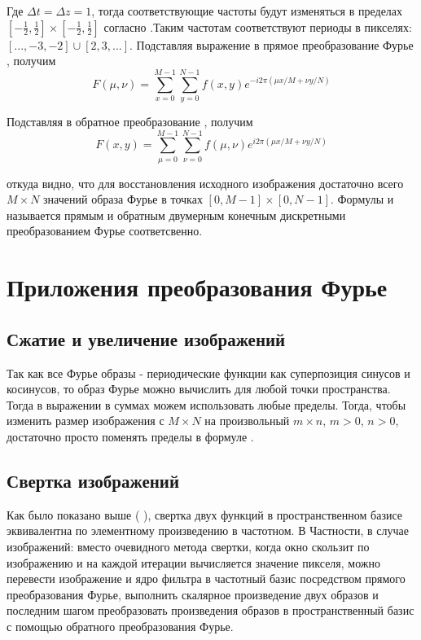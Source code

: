 \documentclass[oneside,final,14pt]{extreport}
\begin{document}
Где $\varDelta t = \varDelta z = 1$, тогда соответствующие частоты будут изменяться в 
 пределах $[-\frac{1}{2},
\frac{1}{2}]
\times
[-\frac{1}{2},
\frac{1}{2}]$ согласно .Таким частотам соответствуют периоды в пикселях: $[...,-3,-2] \cup [2,3,...]$.
Подставляя выражение  в прямое преобразование Фурье , получим
\begin{equation}
F(\mu,\nu)
=
\sum_
{ x =  0}^{M-1}
\sum_
{ y =  0}^{N-1}
f(x,y)
e^{
-i2\pi(\mu x / M +
 \nu y / N )
}
\label{DFFT_2d}
\end{equation}

Подставляя  в обратное преобразование , получим
\begin{equation}
F(x,y)
=
\sum_
{ \mu =  0}^{M-1}
\sum_
{ \nu =  0}^{N-1}
f(\mu,\nu)
e^{
 i2\pi(\mu x / M +
 \nu y / N )
 \label{DIFFT_2d}
}
\end{equation}

откуда видно, что для восстановления исходного изображения достаточно всего $M\times N$ значений образа Фурье в точках $[0,M-1] \times [0,N-1]$.
 Формулы  и  называется прямым и обратным двумерным конечным дискретными преобразованием Фурье соответсвенно.

\chapter{ Приложения преобразования Фурье }
\section{Сжатие и увеличение изображений}
Так как все Фурье образы - периодические функции как суперпозиция синусов и косинусов, то образ Фурье можно вычислить для любой точки пространства. Тогда в выражении   
 в суммах можем использовать любые пределы.
Тогда, чтобы изменить размер изображения с $M\times N$ на произвольный $m\times n$, $m >0$, $n > 0$, достаточно просто поменять пределы в формуле .

\section{Свертка изображений}

Как было показано выше (  ), свертка двух функций в пространственном базисе эквивалентна по элементному произведению в частотном. В Частности, в случае изображений: вместо очевидного метода свертки, когда окно скользит по изображению и на каждой итерации вычисляется значение пикселя, можно перевести изображение и ядро фильтра в частотный базис посредством прямого преобразования Фурье, выполнить скалярное произведение двух образов и последним шагом преобразовать произведения образов в пространственный базис с помощью обратного преобразования Фурье. 
\end{document}
